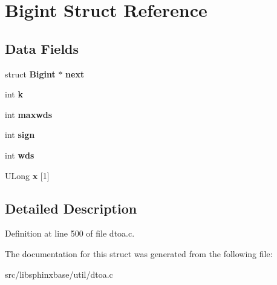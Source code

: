 \section{\-Bigint \-Struct \-Reference}
\label{structBigint}
\subsection*{\-Data \-Fields}
\begin{DoxyCompactItemize}
\item 
struct {\bf \-Bigint} $\ast$ {\bfseries next}\label{structBigint_a3a1296e26ef617e775d5e366e390e7fc}

\item 
int {\bfseries k}\label{structBigint_a032d76e80da2f21df10c0794244d12f2}

\item 
int {\bfseries maxwds}\label{structBigint_a5ffcac6f95ded3bc1fc23204f46f10d0}

\item 
int {\bfseries sign}\label{structBigint_a4380eb98f7653bb74d8377c0d68d6cb7}

\item 
int {\bfseries wds}\label{structBigint_aa737992ebddb9d6a7e2d23bfecdb080e}

\item 
\-U\-Long {\bfseries x} [1]\label{structBigint_ae56981315f471a190603887aee98ca99}

\end{DoxyCompactItemize}


\subsection{\-Detailed \-Description}


\-Definition at line 500 of file dtoa.\-c.



\-The documentation for this struct was generated from the following file\-:\begin{DoxyCompactItemize}
\item 
src/libsphinxbase/util/dtoa.\-c\end{DoxyCompactItemize}
